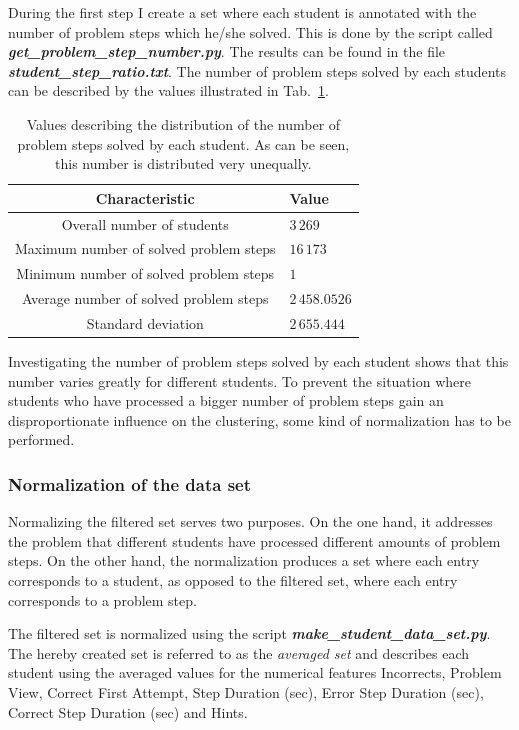 During the first step I create a set where each student is annotated with the number of problem steps which he/she solved. This is done by the script called \textbf{\emph{get\_problem\_step\_number.py}}. The results can be found in the file \textbf{\emph{student\_step\_ratio.txt}}. The number of problem steps solved by each students can be described by the values illustrated in Tab.~\ref{tab_number_problem_steps}.

\begin{table}[b]
	\centering
	\caption{Values describing the distribution of the number of problem steps solved by each student. As can be seen, this number is distributed very unequally.\label{tab_number_problem_steps}}
	\begin{tabular}{cl}
		\toprule
		Characteristic & Value \\		
		\midrule
		Overall number of students & $3\,269$ \\
		Maximum number of solved problem steps & $16\,173$ \\
		Minimum number of solved problem steps & $1$ \\
		Average number of solved problem steps & $2\,458.0526$\\
		Standard deviation & $2\,655.444$ \\
		\bottomrule
	\end{tabular}
\end{table}


Investigating the number of problem steps solved by each student shows that this number varies greatly for different students. To prevent the situation where students who have processed a bigger number of problem steps gain an disproportionate influence on the clustering, some kind of normalization has to be performed.

\subsubsection{Normalization of the data set}
Normalizing the filtered set serves two purposes. On the one hand, it addresses the problem that different students have processed different amounts of problem steps. On the other hand, the normalization produces a set where each entry corresponds to a student, as opposed to the filtered set, where each entry corresponds to a problem step. 

The filtered set is normalized using the script \textbf{\emph{make\_student\_data\_set.py}}. The hereby created set is referred to as the \emph{averaged set} and describes each student using the averaged values for the numerical features Incorrects, Problem View, Correct First Attempt, Step Duration (sec), Error Step Duration (sec), Correct Step Duration (sec) and Hints.

